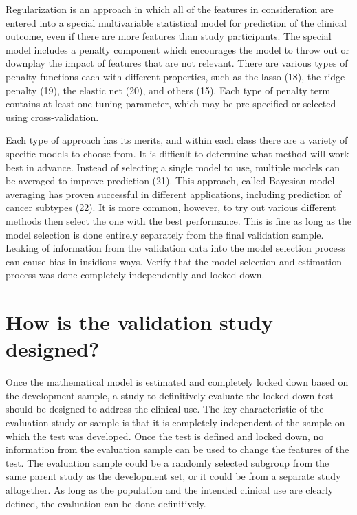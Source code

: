 \documentclass[11pt]{article}
\begin{document}
Regularization is an approach in which all of the features in
consideration are entered into a special multivariable statistical model
for prediction of the clinical outcome, even if there are more features
than study participants. The special model includes a penalty component
which encourages the model to throw out or downplay the impact of
features that are not relevant. There are various types of penalty
functions each with different properties, such as the lasso (18), the
ridge penalty (19), the elastic net (20), and others (15). Each type of
penalty term contains at least one tuning parameter, which may be
pre-specified or selected using cross-validation.

Each type of approach has its merits, and within each class there are a
variety of specific models to choose from. It is difficult to determine
what method will work best in advance. Instead of selecting a single
model to use, multiple models can be averaged to improve prediction
(21). This approach, called Bayesian model averaging has proven
successful in different applications, including prediction of cancer
subtypes (22). It is more common, however, to try out various different
methods then select the one with the best performance. This is fine as
long as the model selection is done entirely separately from the final
validation sample. Leaking of information from the validation data into
the model selection process can cause bias in insidious ways. Verify
that the model selection and estimation process was done completely
independently and locked down.

\section{How is the validation study
designed?}\label{how-is-the-validation-study-designed}

Once the mathematical model is estimated and completely locked down
based on the development sample, a study to definitively evaluate the
locked-down test should be designed to address the clinical use. The key
characteristic of the evaluation study or sample is that it is
completely independent of the sample on which the test was developed.
Once the test is defined and locked down, no information from the
evaluation sample can be used to change the features of the test. The
evaluation sample could be a randomly selected subgroup from the same
parent study as the development set, or it could be from a separate
study altogether. As long as the population and the intended clinical
use are clearly defined, the evaluation can be done definitively.
\end{document}
